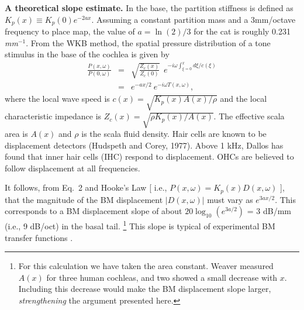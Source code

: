 \documentclass{ws-p8-50x6-00}
\newcommand{\paragraph}[1]{{\bf #1}}
\begin{document}
\paragraph{A theoretical slope estimate.}
In the base, the partition stiffness
is defined as \( K_p(x) \equiv K_p(0)e^{-2ax} \).
Assuming a constant partition mass and a 3mm/octave frequency to place map,
the value of \( a = \ln(2)/3 \) for the cat is roughly 0.231
{\it mm}$^{-1}$.
From the WKB method, the spatial pressure distribution of a tone stimulus
in the base of the cochlea is given by 
\begin{eqnarray}
\frac{P(x,\omega )}{P(0,\omega )}
				& = &
	\sqrt{\frac{Z_c(x)}{Z_c(0)}}\ \ e^{-i\omega \int _{\xi =0}^x d\xi/c(\xi) } \\
				& = &
	e^{-ax/2} \ e^{-i\omega T(x,\omega)},
\end{eqnarray}
where
the local wave speed is \( c(x)=\sqrt{K_p(x)A(x)/\rho } \) and
the local characteristic impedance is \( Z_c(x) = \sqrt{\rho K_p(x)/A(x)} \).
The effective scala area is $A(x)$ and $\rho$ is the scala fluid density.
Hair cells are known to be displacement detectors (Hudspeth and Corey, 1977).
Above 1 kHz, Dallos has found that inner hair cells (IHC) respond to displacement.
OHCs are believed to follow displacement at all frequencies.

It follows, from Eq.~2 and Hooke's Law
[ i.e., \(P(x,\omega)=K_p(x)D(x,\omega)\) ],
that the magnitude of the BM displacement \( |D(x,\omega)| \) must vary as
\( e^{3ax/2} \). This corresponds to a BM displacement
slope of about \( 20 \log_{10}(e^{3a/2})\) = 3 dB/mm (i.e., 9 dB/oct)
in the basal tail.%
	\footnote{ \setlength{\baselineskip}{0.1em}
	For this calculation we have taken the area constant. Weaver
	measured $A(x)$ for three human cochleas, and two showed a small
	decrease with $x$. Including this decrease would make the BM
	displacement slope larger, \emph{strengthening} the argument presented here.}
This slope is typical of experimental BM transfer functions \cite{Allen83a}.
\end{document}
